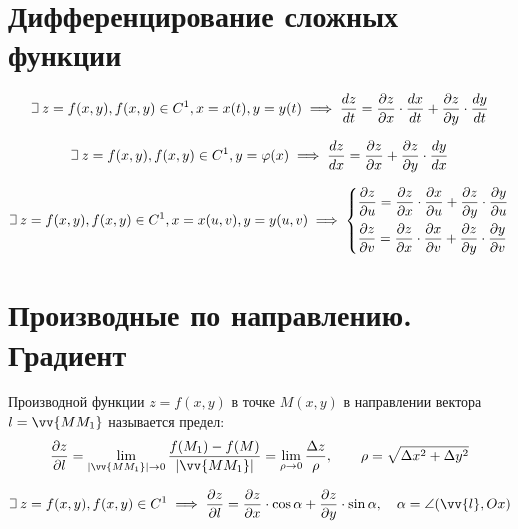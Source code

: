 \documentclass[a4paper,12pt,oneside]{extbook}
\def\lets{%
    \mathord{\setbox0=\hbox{$\exists$}%
        \hbox{\kern 0.125\wd0%
            \vbox to \ht0{%
                \hrule width 0.75\wd0%
                \vfill%
                \hrule width 0.75\wd0}%
            \vrule height \ht0%
            \kern 0.125\wd0}%
    }%
    \hspace{2pt}
}
\theoremstyle{numbered}
\theoremstyle{unnumbered}
\theoremstyle{named}
\theoremstyle{unnumbered}
\theoremstyle{named}
\theoremstyle{named}
\theoremstyle{named}
\begin{document}
\section{Дифференцирование сложных функции}%
\label{sec:Дифференцирование сложных функции}

\begin{equation}
    \lets z = f(x, y), f(x, y) \in C^1, x = x(t), y = y(t)
    \implies
    \frac{dz}{dt} = \frac{\partial z}{\partial x} \cdot \frac{dx}{dt} + \frac{\partial z}{\partial y} \cdot \frac{dy}{dt}
\end{equation}

\begin{equation}
    \lets z = f(x, y), f(x, y) \in C^1, y = \varphi(x)
    \implies
    \frac{dz}{dx} = \frac{\partial z}{\partial x} + \frac{\partial z}{\partial y} \cdot \frac{dy}{dx}
\end{equation}

\begin{equation}
    \lets z = f(x, y), f(x, y) \in C^1, x = x(u, v), y = y(u, v)
    \implies
    \begin{dcases*}
        \frac{\partial z}{\partial u} = \frac{\partial z}{\partial x} \cdot \frac{\partial x}{\partial u} + \frac{\partial z}{\partial y} \cdot \frac{\partial y}{\partial u}
        \\
        \frac{\partial z}{\partial v} = \frac{\partial z}{\partial x} \cdot \frac{\partial x}{\partial v} + \frac{\partial z}{\partial y} \cdot \frac{\partial y}{\partial v}
    \end{dcases*}
\end{equation}


\section{Производные по направлению. Градиент}%
\label{sec:Производные по направлению. Градиент}

Производной функции \(z = f(x, y)\) в точке \(M(x, y)\) в направлении вектора \(l = \vv{MM_1}\) называется предел:
\begin{gather*}
    \frac{\partial z}{\partial l} = \lim_{|\vv{MM_1}| \to 0}{\frac{f(M_1) - f(M)}{|\vv{MM_1}|}} = \lim_{\rho \to 0}{\frac{\Delta z}{\rho}},
    \qquad
    \rho = \sqrt{\Delta x^2 + \Delta y^2}
\end{gather*}

\begin{equation}
    \lets z = f(x, y), f(x, y) \in C^1
    \implies
    \frac{\partial z}{\partial l} = \frac{\partial z}{\partial x} \cdot \cos{\alpha} + \frac{\partial z}{\partial y} \cdot \sin{\alpha},
    \quad
    \alpha = \angle (\vv{l}, Ox)
\end{equation}
\end{document}
